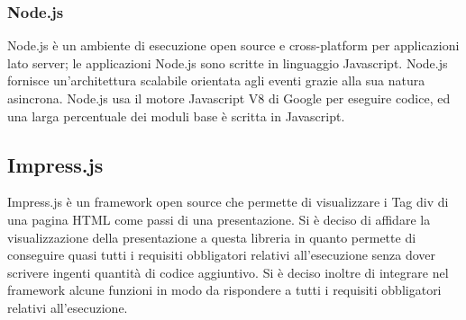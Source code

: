 	\subsubsection{Node.js}{
		Node.js è un ambiente di esecuzione open source e cross-platform per applicazioni lato server; le applicazioni Node.js sono scritte in linguaggio Javascript. Node.js fornisce un'architettura scalabile orientata agli eventi grazie alla sua natura asincrona.
		Node.js usa il motore Javascript V8 di Google per eseguire codice, ed una larga percentuale dei moduli base è scritta in Javascript.
	}
	\subsection{Impress.js}{
		Impress.js è un framework open source che permette di visualizzare i Tag div di una pagina HTML come passi di una presentazione. Si è deciso di affidare la visualizzazione della presentazione a questa libreria in quanto permette di conseguire quasi tutti i requisiti obbligatori relativi all’esecuzione senza dover scrivere ingenti quantità di codice aggiuntivo.
		Si è deciso inoltre di integrare nel framework alcune funzioni in modo da rispondere a tutti i requisiti obbligatori relativi all’esecuzione.
	}